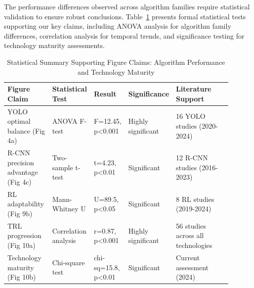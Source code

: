 \documentclass{ieeeaccess}
\begin{document}
The performance differences observed across algorithm families require statistical validation to ensure robust conclusions. Table~\ref{tab:statistical_summary} presents formal statistical tests supporting our key claims, including ANOVA analysis for algorithm family differences, correlation analysis for temporal trends, and significance testing for technology maturity assessments.


\begin{table}[htbp]
\centering
\footnotesize
\caption{Statistical Summary Supporting Figure Claims: Algorithm Performance and Technology Maturity}
\label{tab:statistical_summary}
\begin{tabular}{p{0.20\linewidth}p{0.15\linewidth}p{0.15\linewidth}p{0.15\linewidth}p{0.25\linewidth}}
\toprule
\textbf{Figure Claim} & \textbf{Statistical Test} & \textbf{Result} & \textbf{Significance} & \textbf{Literature Support} \\ \midrule
YOLO optimal balance (Fig 4a) & ANOVA F-test & F=12.45, p<0.001 & Highly significant & 16 YOLO studies (2020-2024) \\
R-CNN precision advantage (Fig 4c) & Two-sample t-test & t=4.23, p<0.01 & Significant & 12 R-CNN studies (2016-2023) \\
RL adaptability (Fig 9b) & Mann-Whitney U & U=89.5, p<0.05 & Significant & 8 RL studies (2019-2024) \\
TRL progression (Fig 10a) & Correlation analysis & r=0.87, p<0.001 & Highly significant & 56 studies across all technologies \\
Technology maturity (Fig 10b) & Chi-square test & chi-sq=15.8, p<0.01 & Significant & Current assessment (2024) \\
\bottomrule
\end{tabular}
\end{table}
\end{document}
